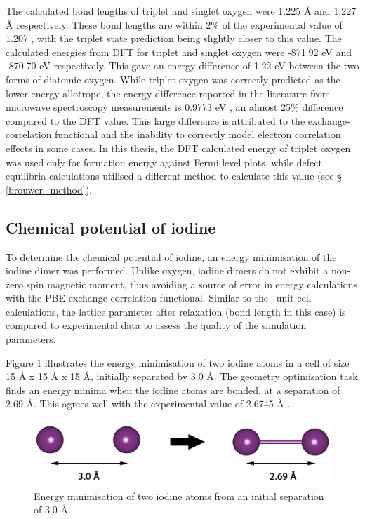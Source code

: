 The calculated bond lengths of triplet and singlet oxygen were 1.225 \r{A} and 1.227 \r{A} respectively. These bond lengths are within 2\% of the experimental value of 1.207 \cite{Lide2016}, with the triplet state prediction being slightly closer to this value. The calculated energies from DFT for triplet and singlet oxygen were -871.92 eV and -870.70 eV respectively. This gave an energy difference of 1.22 eV between the two forms of diatomic oxygen. While triplet oxygen was correctly predicted as the lower energy allotrope, the energy difference reported in the literature from microwave spectroscopy measurements is 0.9773 eV \cite{Atkins2006}, an almost 25\% difference compared to the DFT value. This large difference is attributed to the exchange-correlation functional and the inability to correctly model electron correlation effects in some cases. In this thesis, the DFT calculated energy of triplet oxygen was used only for formation energy against Fermi level plots, while defect equilibria calculations utilised a different method to calculate this value (see § \ref{brouwer_method}).

\subsection{Chemical potential of iodine}

To determine the chemical potential of iodine, an energy minimisation of the iodine dimer was performed. Unlike oxygen, iodine dimers do not exhibit a non-zero spin magnetic moment, thus avoiding a source of error in energy calculations with the PBE exchange-correlation functional. Similar to the \zirconia\ unit cell calculations, the lattice parameter after relaxation (bond length in this case) is compared to experimental data to assess the quality of the simulation parameters.

Figure \ref{figure:iodine_dimer} illustrates the energy minimisation of two iodine atoms in a cell of size 15 \r{A} x 15 \r{A} x 15 \r{A}, initially separated by 3.0 \r{A}. The geometry optimisation task finds an energy minima when the iodine atoms are bonded, at a separation of 2.69 \r{A}. This agrees well with the experimental value of 2.6745 \r{A} \cite{ukaji1966effect}.

\begin{figure}[ht] %
\centering
\includegraphics[width=14cm]{images/iodine_molecule.png}
\caption{Energy minimisation of two iodine atoms from an initial separation of 3.0 \r{A}.}
\label{figure:iodine_dimer}
\end{figure}

